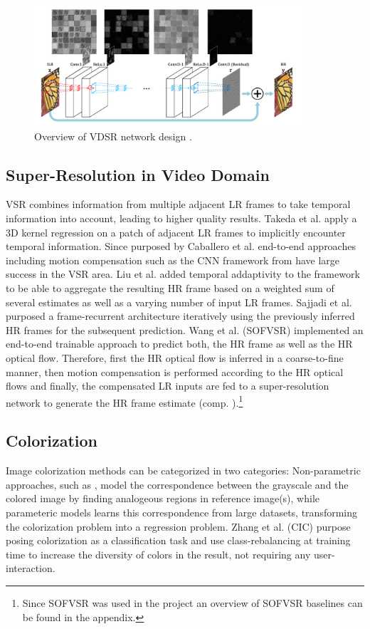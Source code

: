 \begin{figure}[!htbp]
	\centering
	\includegraphics[width=10cm]{figures/vdsr}
	\caption{Overview of VDSR network design \cite{AISRUVDCN}.}
  \label{fig:vdsr}
\end{figure}

\subsection{Super-Resolution in Video Domain}
\ac{VSR} combines information from multiple adjacent LR frames
to take temporal information into account, leading to higher quality results.
Takeda et al. \cite{SRWESME} apply a 3D kernel regression on a patch of adjacent
\ac{LR} frames to implicitly encounter temporal information. Since purposed by
Caballero et al. \cite{RTVSRWSTNAMC} end-to-end approaches including motion
compensation such as the CNN framework from \cite{RTVSRWSTNAMC} have large success
in the VSR area. Liu et al. \cite{RVSRWLTD} added temporal addaptivity to the
framework to be able to aggregate the resulting \ac{HR} frame based on a weighted
sum of several estimates as well as a varying number of input LR frames. Sajjadi
et al. \cite{FRVSR} purposed a frame-recurrent architecture iteratively using
the previously inferred \ac{HR} frames for the subsequent prediction. Wang et al.
\cite{LFVSRTHROFE} (SOFVSR) implemented an end-to-end trainable approach to predict
both, the \ac{HR} frame as well as the HR optical flow. Therefore, first the HR
optical flow is inferred in a coarse-to-fine manner, then motion compensation is
performed according to the HR optical flows and finally, the compensated LR
inputs are fed to a super-resolution network to generate the HR frame estimate
(comp. ).\footnote{Since SOFVSR was used in the project
an overview of SOFVSR baselines can be found in the appendix.}

\subsection{Colorization}
Image colorization methods can be categorized in two categories: Non-parametric
approaches, such as \cite{ICUSI}, model the correspondence between the grayscale
and the colored image by finding analogeous regions in reference image(s),
while parameteric models learns this correspondence from large datasets,
transforming the colorization problem into a regression problem. Zhang et al.
\cite{CIC} (CIC) purpose posing colorization as a classification task and use
class-rebalancing at training time to increase the diversity of colors in the
result, not requiring any user-interaction.

